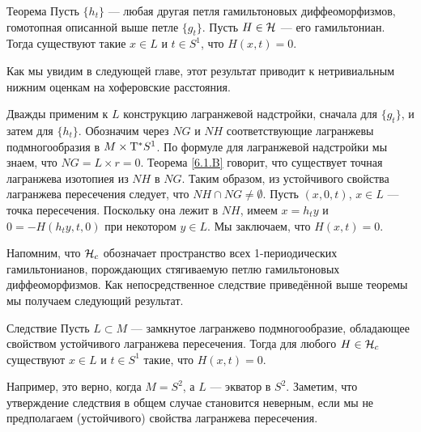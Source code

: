 \begin{thm}{Теорема}\label{6.3.A}
Пусть $\{h_t\}$ — любая другая петля гамильтоновых диффеоморфизмов, гомотопная описанной выше петле $\{g_t\}$.
Пусть $H \in \mathcal{H}$ — его гамильтониан.
Тогда существуют такие $x \in L$ и $t \in S^1$, что $H (x, t) = 0$.
\end{thm}

Как мы увидим в следующей главе, этот результат приводит к нетривиальным нижним оценкам на хоферовские расстояния.

Дважды применим к $L$ конструкцию лагранжевой надстройки, сначала для $\{g_t\}$, и затем для $\{h_t\}$.
Обозначим через $NG$ и $NH$ соответствующие лагранжевы подмногообразия в $M \times \mathrm{T}^\ast S^1$.
По формуле для лагранжевой надстройки мы знаем, что $NG = L \times {r = 0}$.
Теорема \ref{6.1.B} говорит, что существует точная лагранжева изотопиея из $NH$ в $NG$.
Таким образом, из устойчивого свойства лагранжева пересечения следует, что $NH \cap NG \ne \emptyset$.
Пусть $(x, 0, t)$, $x \in L$ — точка пересечения.
Поскольку она лежит в $NH$, имеем $x = h_t y$ и $0 = -H (h_t y, t, 0)$ при некотором $y \in L$.
Мы заключаем, что $H (x, t) = 0$.
\qeds

Напомним, что $\mathcal{H}_c$ обозначает пространство всех 1-периодических гамильтонианов, порождающих стягиваемую петлю гамильтоновых диффеоморфизмов.
Как непосредственное следствие приведённой выше теоремы мы получаем следующий результат.

\begin{thm}{Следствие}\label{6.3.B}
Пусть $L \subset M$ — замкнутое лагранжево подмногообразие,
обладающее свойством устойчивого лагранжева пересечения. 
Тогда для любого $H \in \mathcal{H}_c$ существуют $x \in L$ и $t \in S^1$ такие, что $H (x, t) = 0$.
\end{thm}


Например, это верно, когда $M = S^2$, а $L$ — экватор в $S^2$.
Заметим, что утверждение следствия в общем случае становится неверным, если мы не предполагаем (устойчивого) свойства лагранжева пересечения.

